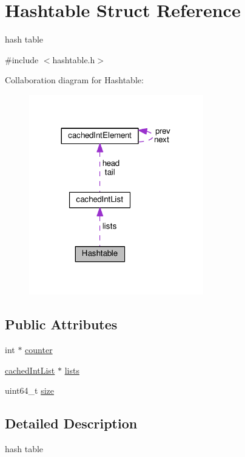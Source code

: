 \hypertarget{structHashtable}{}\section{Hashtable Struct Reference}
\label{structHashtable}


hash table  




{\ttfamily \#include $<$hashtable.\+h$>$}



Collaboration diagram for Hashtable\+:\nopagebreak
\begin{figure}[H]
\begin{center}
\leavevmode
\includegraphics[width=215pt]{structHashtable__coll__graph}
\end{center}
\end{figure}
\subsection*{Public Attributes}
\begin{DoxyCompactItemize}
\item 
int $\ast$ \hyperlink{structHashtable_a99f7c11aa20bbd066528843438a42958}{counter}
\item 
\hyperlink{structcachedIntList}{cached\+Int\+List} $\ast$ \hyperlink{structHashtable_ac4140ebb0209a40547999cce896fe17c}{lists}
\item 
uint64\+\_\+t \hyperlink{structHashtable_aab81586954ce81cc3d52b41cf5ec5a04}{size}
\end{DoxyCompactItemize}


\subsection{Detailed Description}
hash table 

